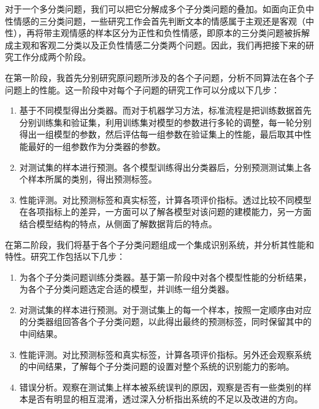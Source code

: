 对于一个多分类问题，我们可以把它分解成多个子分类问题的叠加。如面向正负中性情感的三分类问题，一些研究工作会首先判断文本的情感属于主观还是客观（中性），再将带主观情感的样本区分为正性和负性情感，即原本的三分类问题被拆解成主观和客观二分类以及正负性情感二分类两个问题。因此，我们再把接下来的研究工作分成两个阶段。

在第一阶段，我首先分别研究原问题所涉及的各个子问题，分析不同算法在各个子问题上的性能。这一阶段中对每个子问题的研究工作可以分成以下几步：

\begin{enumerate}

\item 基于不同模型得出分类器。而对于机器学习方法，标准流程是把训练数据首先分别训练集和验证集，利用训练集对模型的参数进行多轮的调整，每一轮分别得出一组模型的参数，然后评估每一组参数在验证集上的性能，最后取其中性能最好的一组参数作为分类器的参数。

\item 对测试集的样本进行预测。各个模型训练得出分类器后，分别预测测试集上各个样本所属的类别，得出预测标签。

\item 性能评测。对比预测标签和真实标签，计算各项评价指标。透过比较不同模型在各项指标上的差异，一方面可以了解各模型对该问题的建模能力，另一方面结合模型结构的特点，从侧面了解数据背后的特点。

\end{enumerate}

在第二阶段，我们将基于各个子分类问题组成一个集成识别系统，并分析其性能和特性。研究工作包括以下几步：

\begin{enumerate}

\item 为各个子分类问题训练分类器。基于第一阶段中对各个模型性能的分析结果，为各个子分类问题选定合适的模型，并训练一组分类器。

\item 对测试集的样本进行预测。对于测试集上的每一个样本，按照一定顺序由对应的分类器组回答各个子分类问题，以此得出最终的预测标签，同时保留其中的中间结果。

\item 性能评测。对比预测标签和真实标签，计算各项评价指标。另外还会观察系统的中间结果，了解每个子分类问题的设置对整个系统的识别能力的影响。

\item 错误分析。观察在测试集上样本被系统误判的原因，观察是否有一些类别的样本是否有明显的相互混淆，透过深入分析指出系统的不足以及改进的方向。

\end{enumerate}

